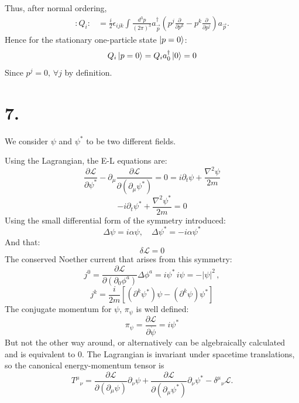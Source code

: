 \documentclass{article}
\newcommand{\pd}{\partial}  %
\newcommand{\pdm}{\partial_\mu}  %
\newcommand{\lagrangian}{\mathcal{L}}
\begin{document}
Thus, after normal ordering,
\begin{equation}
\begin{split}
:Q_i:
&=
\frac{i}{2}
\epsilon_{ijk}
\int \frac{d^3p}{(2\pi)^3}
a_{\vec p}^{\dagger}
\left(
p^j\frac{\partial}{\partial p^k}
-
p^k\frac{\partial}{\partial p^j}
\right)
a_{\vec p}.
\end{split}
\end{equation}
Hence for the stationary one-particle state $\ket{p=0}$:
\begin{equation}
    Q_i\ket{p=0}=Q_i a^{\dagger}_0 \ket{0}=0
\end{equation}
Since $p^j=0, \, \forall j$ by definition.

\section*{7.}
We consider $\psi$ and $\psi^*$ to be two different fields. 

Using the Lagrangian, the E-L equations are:
\begin{equation}
    \frac{\partial \lagrangian}{\partial \psi^*}-\pdm \frac{\partial \lagrangian}{\partial(\pdm \psi^*)}=0=i\pd_t\psi + \frac{\nabla^2\psi}{2m}
\end{equation}
\begin{equation}
    -i\pd_t\psi^* + \frac{\nabla^2\psi^*}{2m}=0
\end{equation}
Using the small differential form of the symmetry introduced:
\begin{equation}
    \Delta\psi = i\alpha\psi, \quad \Delta\psi^*=-i\alpha \psi^*
\end{equation}
And that:
$$
\delta \lagrangian = 0
$$
The conserved Noether current that arises from this symmetry:
\begin{equation}
    j^0 = \frac{\pd\lagrangian}{\pd (\pd_0 \phi^a)}\Delta\phi^a=i\psi^* \, i\psi = -|\psi|^2 \, ,
\end{equation}
\begin{equation}
    j^k=\frac{i}{2m}[(\pd^k\psi^*)\psi - (\pd^k\psi)\psi^*]
\end{equation}
The conjugate momentum for $\psi$, $\pi_\psi$ is well defined:
$$
\pi_\psi = \frac{\partial \lagrangian}{\pd \dot{\psi}}=i\psi^*
$$
But not the other way around, or alternatively can be algebraically calculated and is equivalent to $0$. 
The Lagrangian is invariant under spacetime translations, so the canonical energy-momentum tensor is
\begin{equation}
T^\mu{}_\nu
=
\frac{\partial \lagrangian}{\partial(\partial_\mu \psi)}
\partial_\nu \psi
+
\frac{\partial \lagrangian}{\partial(\partial_\mu \psi^*)}
\partial_\nu \psi^*
-
\delta^\mu{}_\nu \lagrangian .
\end{equation}
\end{document}
